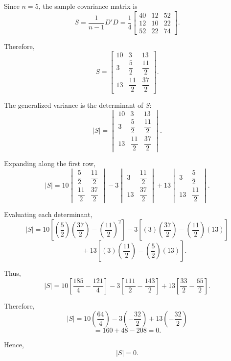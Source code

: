 \documentclass[12pt]{article}
\begin{document}
	Since \(n=5\), the sample covariance matrix is
	\[
	S
	=
	\frac{1}{n-1}D'D
	=
	\frac14
	\begin{bmatrix}
		40&12&52\\
		12&10&22\\
		52&22&74
	\end{bmatrix}.
	\]
	
	Therefore,
	\[
	\boxed{
		S=
		\begin{bmatrix}
			10&3&13\\
			3&\dfrac52&\dfrac{11}{2}\\[5pt]
			13&\dfrac{11}{2}&\dfrac{37}{2}
	\end{bmatrix}}.
	\]
	
	The generalized variance is the determinant of \(S\):
	\[
	|S|
	=
	\begin{vmatrix}
		10&3&13\\
		3&\dfrac52&\dfrac{11}{2}\\[5pt]
		13&\dfrac{11}{2}&\dfrac{37}{2}
	\end{vmatrix}.
	\]
	
	Expanding along the first row,
	\[
	|S|
	=
	10
	\begin{vmatrix}
		\dfrac52&\dfrac{11}{2}\\[3pt]
		\dfrac{11}{2}&\dfrac{37}{2}
	\end{vmatrix}
	-
	3
	\begin{vmatrix}
		3&\dfrac{11}{2}\\[3pt]
		13&\dfrac{37}{2}
	\end{vmatrix}
	+
	13
	\begin{vmatrix}
		3&\dfrac52\\[3pt]
		13&\dfrac{11}{2}
	\end{vmatrix}.
	\]
	
	Evaluating each determinant,
	\[
	|S|
	=
	10
	\left[
	\left(\frac52\right)\left(\frac{37}{2}\right)
	-
	\left(\frac{11}{2}\right)^2
	\right]
	-
	3
	\left[
	(3)\left(\frac{37}{2}\right)
	-
	\left(\frac{11}{2}\right)(13)
	\right]
	\]
	\[
	\qquad
	+
	13
	\left[
	(3)\left(\frac{11}{2}\right)
	-
	\left(\frac52\right)(13)
	\right].
	\]
	
	Thus,
	\[
	|S|
	=
	10
	\left[
	\frac{185}{4}-\frac{121}{4}
	\right]
	-
	3
	\left[
	\frac{111}{2}-\frac{143}{2}
	\right]
	+
	13
	\left[
	\frac{33}{2}-\frac{65}{2}
	\right].
	\]
	
	Therefore,
	\[
	|S|
	=
	10\left(\frac{64}{4}\right)
	-
	3\left(-\frac{32}{2}\right)
	+
	13\left(-\frac{32}{2}\right)
	\]
	\[
	=160+48-208
	=0.
	\]
	
	Hence,
	\[
	\boxed{|S|=0}.
	\]
	
\end{document}
